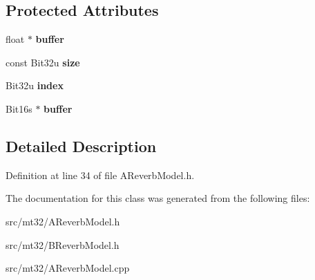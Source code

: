 \subsection*{Protected Attributes}
\begin{DoxyCompactItemize}
\item 
\hypertarget{classMT32Emu_1_1RingBuffer_a8b72fb8ed4ed89e8d1b73530e3d120b7}{float $\ast$ {\bfseries buffer}}\label{classMT32Emu_1_1RingBuffer_a8b72fb8ed4ed89e8d1b73530e3d120b7}

\item 
\hypertarget{classMT32Emu_1_1RingBuffer_a6e646e859e623dab2baea272402fbeda}{const Bit32u {\bfseries size}}\label{classMT32Emu_1_1RingBuffer_a6e646e859e623dab2baea272402fbeda}

\item 
\hypertarget{classMT32Emu_1_1RingBuffer_a1d5fa4cc1464c949f7534f4ef39e826f}{Bit32u {\bfseries index}}\label{classMT32Emu_1_1RingBuffer_a1d5fa4cc1464c949f7534f4ef39e826f}

\item 
\hypertarget{classMT32Emu_1_1RingBuffer_a38359605daa5bc1eec745e091e9d9436}{Bit16s $\ast$ {\bfseries buffer}}\label{classMT32Emu_1_1RingBuffer_a38359605daa5bc1eec745e091e9d9436}

\end{DoxyCompactItemize}


\subsection{Detailed Description}


Definition at line 34 of file A\-Reverb\-Model.\-h.



The documentation for this class was generated from the following files\-:\begin{DoxyCompactItemize}
\item 
src/mt32/A\-Reverb\-Model.\-h\item 
src/mt32/B\-Reverb\-Model.\-h\item 
src/mt32/A\-Reverb\-Model.\-cpp\end{DoxyCompactItemize}
